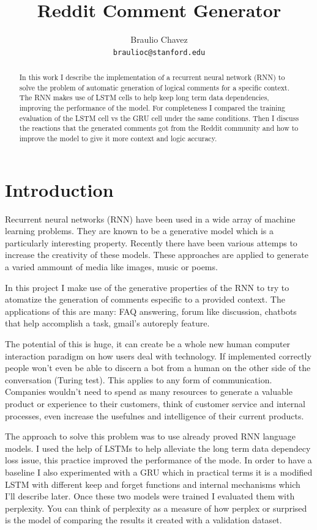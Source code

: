 \documentclass{article} %
\begin{document}
\title{Reddit Comment Generator}
\author{Braulio Chavez \\
  \texttt{braulioc@stanford.edu}}
\maketitle

\begin{abstract}
In this work I describe the implementation of a recurrent neural network (RNN)
to solve the problem of automatic generation of logical comments for a specific
context. The RNN makes use of LSTM cells to help keep long term data
dependencies, improving the performance of the model. For completeness I
compared the training evaluation of the LSTM cell vs the GRU cell under the
same conditions. Then I discuss the reactions that the generated comments got
from the Reddit community and how to improve the model to give it more context
and logic accuracy.
\end{abstract}

\section{Introduction}
Recurrent neural networks (RNN) have been used in a wide array of machine
learning problems. They are known to be a generative model which is a
particularly interesting property. Recently there have been various attemps to
increase the creativity of these models. These approaches are applied to
generate a varied ammount of media like images, music or poems.

In this project I make use of the generative properties of the RNN to try to
atomatize the generation of comments especific to a provided context. The
applications of this are many: FAQ answering, forum like discussion, chatbots
that help accomplish a task, gmail's autoreply feature.

The potential of this is huge, it can create be a whole new human computer
interaction paradigm on how users deal with technology. If implemented correctly
people won't even be able to discern a bot from a human on the other side of the
conversation (Turing test). This applies to any form of communication. Companies
wouldn't need to spend as many resources to generate a valuable product or
experience to their customers, think of customer service and internal processes,
even increase the usefulnes and intelligence of their current products.

The approach to solve this problem was to use already proved RNN language
models. I used the help of LSTMs to help alleviate the long term data dependecy
loss issue, this practice improved the performance of the mode. In order to have
a baseline I also experimented with a GRU which in practical terms it is a
modified LSTM with different keep and forget functions and internal mechanisms
which I'll describe later. Once these two models were trained I evaluated them
with perplexity. You can think of perplexity as a measure of how perplex or
surprised is the model of comparing the results it created with a validation
dataset.
\end{document}

